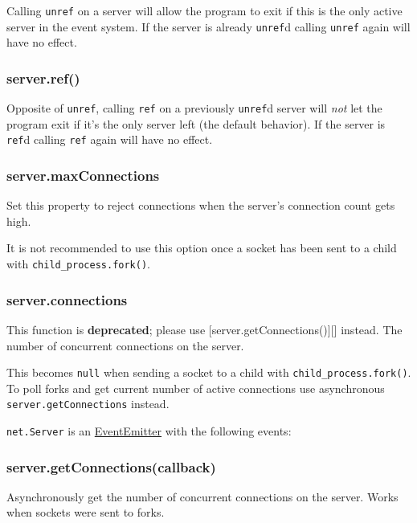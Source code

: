 Calling \texttt{unref} on a server will allow the program to exit if
this is the only active server in the event system. If the server is
already \texttt{unref}d calling \texttt{unref} again will have no
effect.

\subsubsection{server.ref()}\label{server.ref}

Opposite of \texttt{unref}, calling \texttt{ref} on a previously
\texttt{unref}d server will \emph{not} let the program exit if it's the
only server left (the default behavior). If the server is \texttt{ref}d
calling \texttt{ref} again will have no effect.

\subsubsection{server.maxConnections}\label{server.maxconnections}

Set this property to reject connections when the server's connection
count gets high.

It is not recommended to use this option once a socket has been sent to
a child with \texttt{child\_process.fork()}.

\subsubsection{server.connections}\label{server.connections}

This function is \textbf{deprecated}; please use
{[}server.getConnections(){]}{[}{]} instead. The number of concurrent
connections on the server.

This becomes \texttt{null} when sending a socket to a child with
\texttt{child\_process.fork()}. To poll forks and get current number of
active connections use asynchronous \texttt{server.getConnections}
instead.

\texttt{net.Server} is an
\href{events.html\#events_class_events_eventemitter}{EventEmitter} with
the following events:

\subsubsection{server.getConnections(callback)}\label{server.getconnectionscallback}

Asynchronously get the number of concurrent connections on the server.
Works when sockets were sent to forks.


